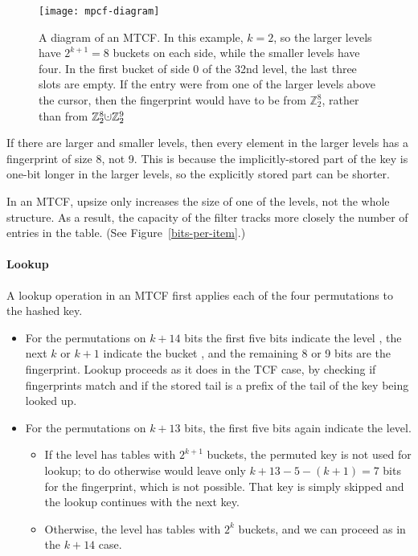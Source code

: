 \documentclass[letterpaper,twocolumn,10pt]{article}
\newcommand{\ints}{\mathbb{Z}}
\newcommand{\dotcup}{\ensuremath{\mathaccent\cdot\cup}}
\begin{document}

\begin{figure}
  \texttt{[image: mpcf-diagram]}
\caption{\label{mtcf-diagram}
A diagram of an MTCF.
In this example, $k = 2$, so the larger levels have $2^{k+1} = 8$ buckets on each side, while the smaller levels have four.
In the first bucket of side 0 of the 32nd level, the last three slots are empty.
If the entry were from one of the larger levels above the cursor, then the fingerprint would have to be from $\ints_2^8$, rather than from $\ints_2^8 \dotcup \ints_2^9$
}

\end{figure}

If there are larger and smaller levels, then every element in the larger levels has a fingerprint of size 8, not 9.
This is because the implicitly-stored part of the key is one-bit longer in the larger levels, so the explicitly stored part can be shorter.

In an MTCF, upsize only increases the size of one of the levels, not the whole structure.
As a result, the capacity of the filter tracks more closely the number of entries in the table. (See Figure~\ref{bits-per-item}.)

\paragraph{Lookup}
A lookup operation in an MTCF first applies each of the four permutations to the hashed key.
\begin{itemize}
\item For the permutations on $k + 14$ bits %
the first five bits indicate the level %
, the next $k$ or $k+1$ indicate the bucket %
, and the remaining 8 or 9 bits are the fingerprint.
Lookup proceeds as it does in the TCF case, by checking if fingerprints match and if the stored tail is a prefix of the tail of the key being looked up. %
\item For the permutations on $k + 13$ bits, the first five bits again indicate the level. %
\begin{itemize}
\item If the level has tables with $2^{k+1}$ buckets, the permuted key is not used for lookup; to do otherwise would leave only $k+13 - 5 - (k+1) = 7$ bits for the fingerprint, which is not possible.
That key is simply skipped and the lookup continues with the next key. %
\item Otherwise, the level has tables with $2^k$ buckets, and we can proceed as in the $k+14$ case. %
\end{itemize}
\end{itemize}
\end{document}
